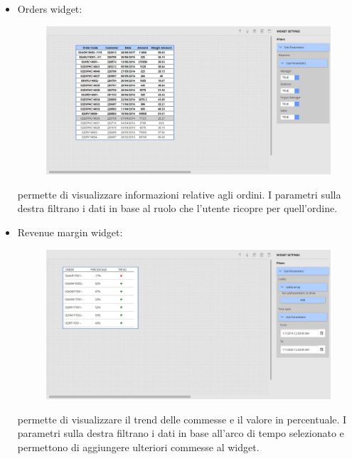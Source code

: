 \begin{itemize}
    \item Orders widget: 
    
\begin{figure}[ht]
\centering
\includegraphics[scale=0.32]{Images/Orders.JPG}
\end{figure}
permette di visualizzare informazioni relative agli ordini. I parametri sulla destra filtrano i dati in base al ruolo che l'utente ricopre per quell'ordine.
\end{itemize}
\pagebreak
\begin{itemize}
    \item Revenue margin widget: 
    
\begin{figure}[ht]
\centering
\includegraphics[scale=0.32]{Images/RevenueMargin.JPG}
\end{figure}
permette di visualizzare il trend delle commesse e il valore in percentuale. I parametri sulla destra filtrano i dati in base all'arco di tempo selezionato e permettono di aggiungere ulteriori commesse al widget.
\end{itemize}
